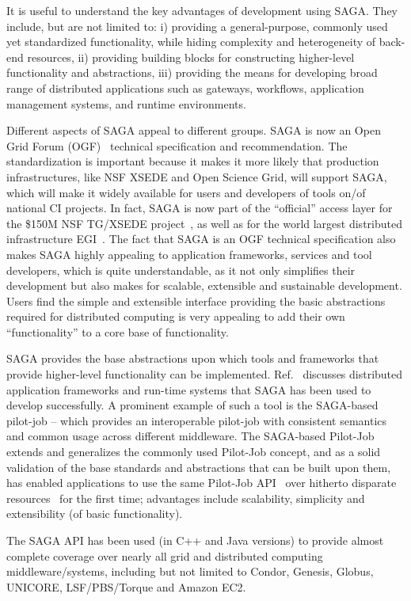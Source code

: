 \documentclass{article}
\begin{document}
It is useful to understand the key advantages of development using
SAGA. They include, but are not limited to: i) providing a
general-purpose, commonly used yet standardized functionality, while
hiding complexity and heterogeneity of back-end resources, ii)
providing building blocks for constructing higher-level functionality
and abstractions, iii) providing the means for developing broad range
of distributed applications such as gateways, workﬂows, application
management systems, and runtime environments.

Different aspects of SAGA appeal to different groups. SAGA is now an
Open Grid Forum (OGF)~\cite{ogf-url} technical specification and
recommendation. The standardization is important because it makes it
more likely that production infrastructures, like NSF XSEDE and Open
Science Grid, will support SAGA, which will make it widely available
for users and developers of tools on/of national CI projects. In fact,
SAGA is now part of the “oﬃcial” access layer for the \$150M NSF
TG/XSEDE project~\cite{xsede}, as well as for the world largest
distributed infrastructure EGI~\cite{egi}. The fact that SAGA is an
OGF technical speciﬁcation also makes SAGA highly appealing to
application frameworks, services and tool developers, which is quite
understandable, as it not only simpliﬁes their development but also
makes for scalable, extensible and sustainable development. Users ﬁnd
the simple and extensible interface providing the basic abstractions
required for distributed computing is very appealing to add their own
“functionality” to a core base of functionality.

SAGA provides the base abstractions upon which tools and frameworks
that provide higher-level functionality can be
implemented. Ref.~\cite{saga-url} discusses distributed application
frameworks and run-time systems that SAGA has been used to develop
successfully. A prominent example of such a tool is the SAGA-based
pilot-job – which provides an interoperable pilot-job with consistent
semantics and common usage across different middleware. The SAGA-based
Pilot-Job extends and generalizes the commonly used Pilot-Job concept,
and as a solid validation of the base standards and abstractions that
can be built upon them, has enabled applications to use the same
Pilot-Job API~\cite{} over hitherto disparate resources~\cite{} for
the ﬁrst time; advantages include scalability, simplicity and
extensibility (of basic functionality).

The SAGA API has been used (in C++ and Java versions) to provide
almost complete coverage over nearly all grid and distributed
computing middleware/systems, including but not limited to Condor,
Genesis, Globus, UNICORE, LSF/PBS/Torque and Amazon EC2.
\end{document}

